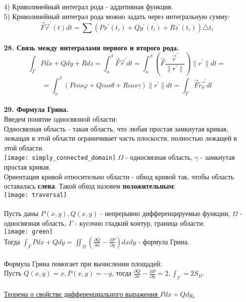 \documentclass[12pt]{article}
\begin{document}
4) Криволинейный интеграл  рода - аддитивная функция.\\
5) Криволинейный интеграл  рода можно задать через интегральную сумму:\\
$$\overrightarrow{F} \overrightarrow{r}^{'}(t) dt = \sum (Px^{'}(t_i) + Qy^{'}(t_i) + Rz^{'}(t_i)){\bigtriangleup t_i}$$
\\
\label{question28}\textbf{28. Связь между интегралами первого и второго рода.}\\
$$\int_\Gamma Pdx+Qdy+Rdz = \int_\alpha^\beta \overrightarrow{F} \overrightarrow{r}^{'} dt = \int_\alpha^\beta (\overrightarrow{F} \frac{\overrightarrow{r}^{'}}{\|r^{'} \|})\|r^{'} \|dt =$$
$$=\int_\alpha^\beta(Pcos\varphi+Qcos\theta+Rcos\gamma)\|r^{'} \|dt=\int_\Gamma \overrightarrow{F} \overrightarrow{r_0}^{'} dl$$
\\
\label{question29_1}\textbf{29. Формула Грина.}\\
Введем понятие односвязной области:\\
Односвязная область - такая область, что любая простая замкнутая кривая, лежащая в этой области ограничивает часть плоскости, полностью лежащей в этой области.\\
\texttt{[image: simply\_connected\_domain]} $\Omega$ - односвязная область, $\gamma$ - замкнутая простая кривая.\\
Ориентация кривой относительно области - обход кривой так, чтобы область оставалась \textbf{слева}. Такой обход назовем \textbf{положительным}:\\
\texttt{[image: traversal]}\\
\\
Пусть даны $P(x,y), Q(x,y)$ - непрерывно дифференцируемые функции, $\Omega$ - односвязная область, $\Gamma$ - кусочно гладкий контур, граница области:\\
\texttt{[image: green]}\\
Тогда $\int_\Gamma Pdx+Qdy = \iint_\Omega (\frac{\partial Q}{\partial x} - \frac{\partial P}{\partial y}) dxdy$ - формула Грина.\\
\\
Формула Грина помогает при вычислении площадей:\\
Пусть $Q(x,y) = x, P(x,y) = -y$, тогда $\frac{\partial Q}{\partial x} - \frac{\partial P}{\partial y} = 2, \int_\Gamma = 2S_{\Omega}$.\\
\\
\label{question29_2}\uline{Теорема о свойстве дифференциального выражения $Pdx + Qdy$.}\\
\end{document}
